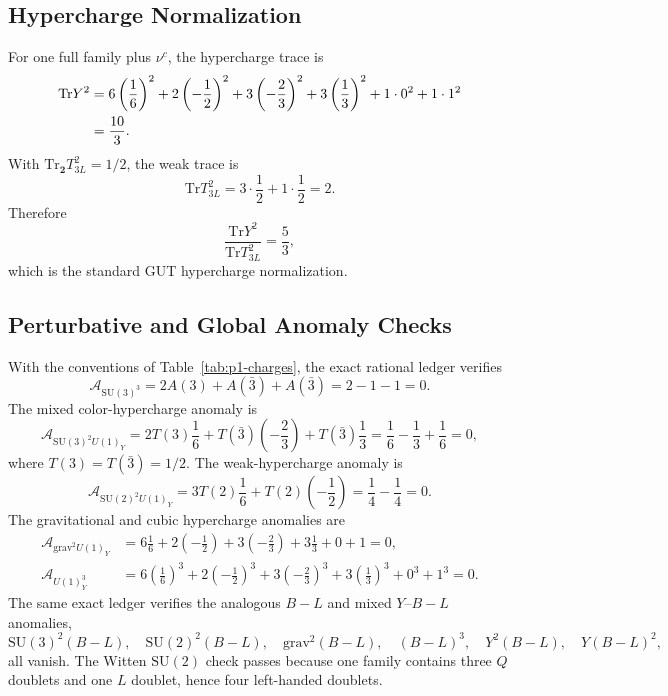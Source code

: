 \documentclass[11pt]{article}
\newcommand{\SU}{\mathrm{SU}}
\newcommand{\Tr}{\mathrm{Tr}}
\newcommand{\bml}{B-L}
\newcommand{\nuc}{\nu^c}
\begin{document}
\subsection{Hypercharge Normalization}

For one full family plus $\nuc$, the hypercharge trace is
\begin{align}
  \Tr Y^2
  &=
  6\left(\frac{1}{6}\right)^2
  +2\left(-\frac{1}{2}\right)^2
  +3\left(-\frac{2}{3}\right)^2
  +3\left(\frac{1}{3}\right)^2
  +1\cdot 0^2
  +1\cdot 1^2                                              \notag\\
  &=\frac{10}{3}.
\end{align}
With $\Tr_{\mathbf 2}T_{3L}^2=1/2$, the weak trace is
\begin{equation}
  \Tr T_{3L}^2
  =
  3\cdot \frac{1}{2}
  +1\cdot \frac{1}{2}
  =2.
\end{equation}
Therefore
\begin{equation}
  \frac{\Tr Y^2}{\Tr T_{3L}^2}=\frac{5}{3},
\end{equation}
which is the standard GUT hypercharge normalization.

\subsection{Perturbative and Global Anomaly Checks}

With the conventions of Table~\ref{tab:p1-charges}, the exact rational
ledger verifies
\begin{equation}
  \mathcal A_{\SU(3)^3}
  =
  2A(3)+A(\bar 3)+A(\bar 3)
  =
  2-1-1=0 .
\end{equation}
The mixed color-hypercharge anomaly is
\begin{equation}
  \mathcal A_{\SU(3)^2U(1)_Y}
  =
  2T(3)\frac{1}{6}
  +T(\bar 3)\left(-\frac{2}{3}\right)
  +T(\bar 3)\frac{1}{3}
  =
  \frac{1}{6}-\frac{1}{3}+\frac{1}{6}=0,
\end{equation}
where $T(3)=T(\bar 3)=1/2$.  The weak-hypercharge anomaly is
\begin{equation}
  \mathcal A_{\SU(2)^2U(1)_Y}
  =
  3T(2)\frac{1}{6}
  +T(2)\left(-\frac{1}{2}\right)
  =
  \frac{1}{4}-\frac{1}{4}=0.
\end{equation}
The gravitational and cubic hypercharge anomalies are
\begin{align}
  \mathcal A_{\mathrm{grav}^2U(1)_Y}
  &=
  6\frac{1}{6}
  +2\left(-\frac{1}{2}\right)
  +3\left(-\frac{2}{3}\right)
  +3\frac{1}{3}
  +0+1
  =0,                                                        \\
  \mathcal A_{U(1)_Y^3}
  &=
  6\left(\frac{1}{6}\right)^3
  +2\left(-\frac{1}{2}\right)^3
  +3\left(-\frac{2}{3}\right)^3
  +3\left(\frac{1}{3}\right)^3
  +0^3+1^3
  =0.
\end{align}
The same exact ledger verifies the analogous $\bml$ and mixed
$Y$--$\bml$ anomalies,
\begin{equation}
  \SU(3)^2(\bml),\quad
  \SU(2)^2(\bml),\quad
  \mathrm{grav}^2(\bml),\quad
  (\bml)^3,\quad
  Y^2(\bml),\quad
  Y(\bml)^2,
\end{equation}
all vanish.  The Witten $\SU(2)$ check passes because one family contains
three $Q$ doublets and one $L$ doublet, hence four left-handed doublets.
\end{document}
